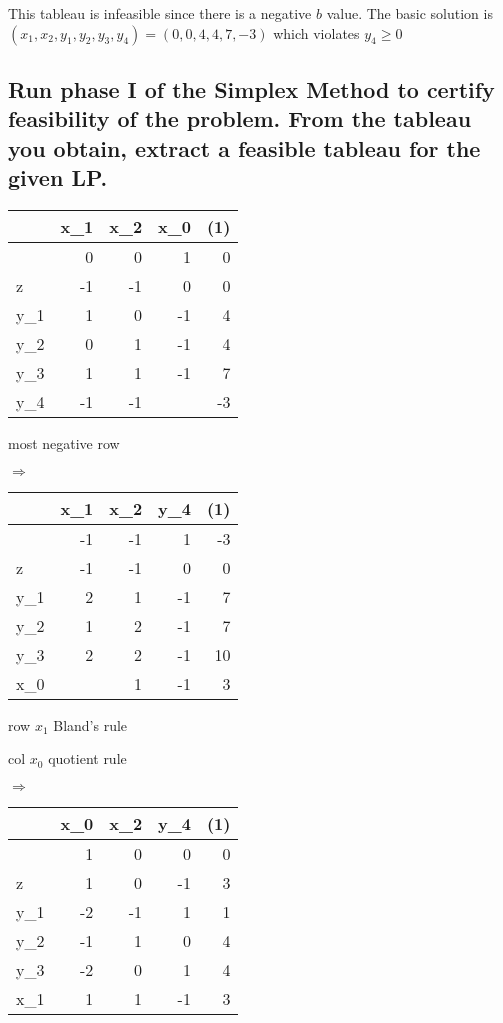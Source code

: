 \documentclass[12pt, a4]{article}
\begin{document}
	This tableau is infeasible since there is a negative $b$ value. The basic solution is $(x_1,x_2,y_1,y_2,y_3,y_4) = (0,0,4,4,7,-3)$ which violates $y_4 \geq 0$
	
\subsection{Run phase I of the Simplex Method to certify feasibility of the problem. From the tableau you obtain, extract a feasible tableau for the given LP.}{\label{sec:1c}}
\begin{minipage}[t]{.3\textwidth}
\begin{tabular}{L|RRR||R}
	& x_1 & x_2 & x_0 & (1) \\
	\hline
	 & 0 & 0 & 1 & 0 \\
	\hline
	z & -1 & -1 & 0 &0 \\
	\hline
	y_1 & 1 & 0 & -1 &4 \\
	y_2 & 0 & 1 & -1 &4 \\
	y_3 & 1 & 1 & -1 &7 \\
	y_4 & -1 & -1 &  & -3 \\
\end{tabular}

most negative row 

\end{minipage}
$\Rightarrow$
\begin{minipage}[t]{.3\textwidth}

	\begin{tabular}{L|RRR||R}
		& x_1 & x_2 & y_4 & (1)  \\
		\hline
		 & -1 & -1 & 1 & -3 \\
		\hline
		z & -1 & -1 & 0 &0 \\
		\hline
		y_1 & 2 & 1 & -1 &7 \\
		y_2 & 1 & 2 & -1 &7 \\
		y_3 & 2 & 2 & -1 &10 \\
		x_0 &  & 1 & -1 & 3 \\
	\end{tabular}

row $x_1$ Bland's rule

col $x_0$ quotient rule

\end{minipage}
$\Rightarrow$
\begin{minipage}[t]{.3\textwidth}
	\begin{tabular}{L|RRR||R}
		& x_0 & x_2 & y_4 & (1)  \\
		\hline
		 & 1 & 0 & 0 & 0 \\
		\hline
		z & 1 & 0 & -1    & 3 \\
		\hline
		y_1 & -2 &-1 & 1 & 1 \\
		y_2 & -1 & 1 & 0 & 4 \\
		y_3 & -2 & 0 & 1 & 4 \\
		x_1 & 1  & 1 &-1 & 3 \\
	\end{tabular}

\end{minipage}
\end{document}
